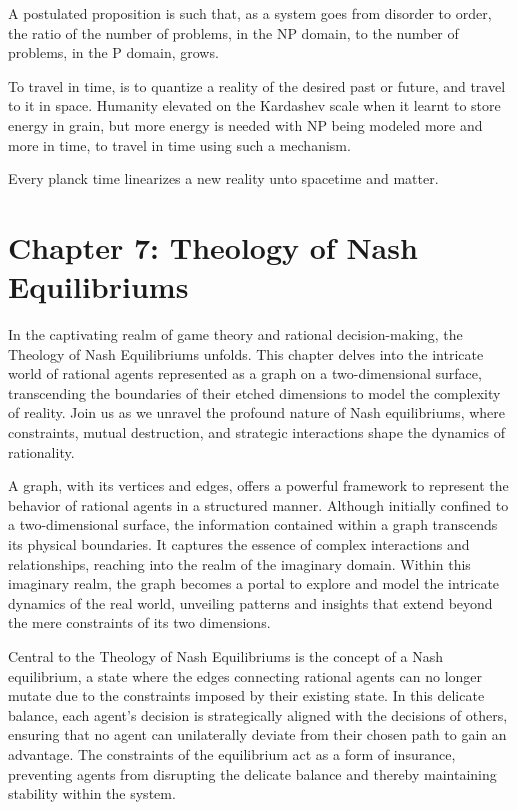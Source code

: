 \documentclass[ebook,12pt,oneside,openany]{memoir}
\begin{document}
\indent A postulated proposition is such that, as a system goes from disorder to order, the ratio of the number of problems, in the NP domain, to the number of problems, in the P domain, grows.

\indent To travel in time, is to quantize a reality of the desired past or future, and travel to it in space. Humanity elevated on the Kardashev scale when it learnt to store energy in grain, but more energy is needed with NP being modeled more and more in time, to travel in time using such a mechanism.

\indent Every planck time linearizes a new reality unto spacetime and matter.
\chapter*{Chapter 7: Theology of Nash Equilibriums}


\indent \indent In the captivating realm of game theory and rational decision-making, the Theology of Nash Equilibriums unfolds. This chapter delves into the intricate world of rational agents represented as a graph on a two-dimensional surface, transcending the boundaries of their etched dimensions to model the complexity of reality. Join us as we unravel the profound nature of Nash equilibriums, where constraints, mutual destruction, and strategic interactions shape the dynamics of rationality.

\indent A graph, with its vertices and edges, offers a powerful framework to represent the behavior of rational agents in a structured manner. Although initially confined to a two-dimensional surface, the information contained within a graph transcends its physical boundaries. It captures the essence of complex interactions and relationships, reaching into the realm of the imaginary domain. Within this imaginary realm, the graph becomes a portal to explore and model the intricate dynamics of the real world, unveiling patterns and insights that extend beyond the mere constraints of its two dimensions.

\indent Central to the Theology of Nash Equilibriums is the concept of a Nash equilibrium, a state where the edges connecting rational agents can no longer mutate due to the constraints imposed by their existing state. In this delicate balance, each agent's decision is strategically aligned with the decisions of others, ensuring that no agent can unilaterally deviate from their chosen path to gain an advantage. The constraints of the equilibrium act as a form of insurance, preventing agents from disrupting the delicate balance and thereby maintaining stability within the system.
\end{document}
